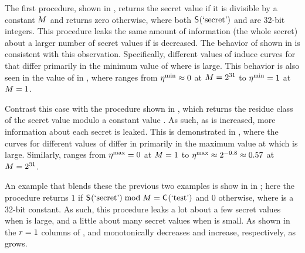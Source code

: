 The first procedure, shown in , returns
the secret value if it is divisible by a constant $M$ and
returns zero otherwise, where both $\mathsf{S}_{}(\textrm{`secret'})$ and \modulus
are 32-bit integers.  This procedure leaks the same amount of
information (the whole secret) about a larger number of secret values
if \modulus is decreased.  The behavior of \Jaccard{\secretsSetSize}
shown in  is consistent with this
observation.  Specifically, different values of \modulus induce curves
for \Jaccard{\secretsSetSize} that differ primarily in the minimum
value of \secretsSetSize where \Jaccard{\secretsSetSize} is large.
This behavior is also seen in the value of \secretsSetSizeMin{} in
, where \secretsSetSizeMin{} ranges from
$\eta^{\textrm{min}}_{} \approx 0$ at $M = 2^{31}$ to
$\eta^{\textrm{min}}_{} = 1$ at $M = 1$.

Contrast this case with the procedure shown in
, which returns the residue class of the
secret value modulo a constant value \modulus.  As such, as \modulus
is increased, more information about each secret is leaked.  This is
demonstrated in , where the curves for
different values of \modulus differ in primarily in the maximum value
\secretsSetSize at which \Jaccard{\secretsSetSize} is large.
Similarly, \secretsSetSizeMax{} ranges from $\eta^{\textrm{max}}_{} = 0$
at $M = 1$ to $\eta^{\textrm{max}}_{} \approx
2^{-0.8} \approx 0.57$ at $M = 2^{31}$.

An example that blends these the previous two examples is show in in
; here the procedure returns $1$ if
$\mathsf{S}_{}(\textrm{`secret'}) \bmod M = \mathsf{C}_{}(\textrm{`test'})$ and
$0$ otherwise, where \modulus is a 32-bit constant.  As such, this
procedure leaks a lot about a few secret values when \modulus is
large, and a little about many secret values when \modulus is small.
As shown in the $r=1$ columns of ,
\secretsSetSizeMin{} and \secretsSetSizeMax{} monotonically decreases
and increase, respectively, as \modulus grows.

